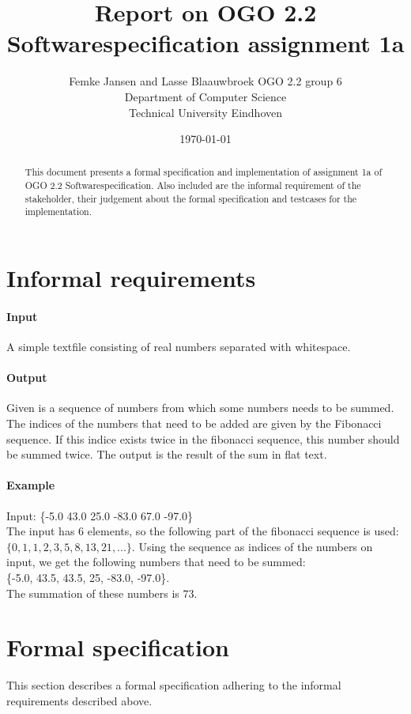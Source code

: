 \documentclass[12pt]{article}
\title{Report on OGO 2.2 Softwarespecification assignment 1a}
\author{
        Femke Jansen and Lasse Blaauwbroek OGO 2.2 group 6 \\
                Department of Computer Science\\
        Technical University Eindhoven\\
}
\date{\today}
\begin{document}
\maketitle

\begin{abstract}
This document presents a formal specification and implementation of assignment 1a of OGO 2.2 Softwarespecification. Also included are the informal requirement of the stakeholder, their judgement about the formal specification and testcases for the implementation.
\end{abstract}

\section{Informal requirements}
\paragraph{Input} A simple textfile consisting of real numbers separated with whitespace.
\paragraph{Output} Given is a sequence of numbers from which some numbers needs to be summed. The indices of the numbers that need to be added are given by the Fibonacci sequence. If this indice exists twice in the fibonacci sequence, this number should be summed twice. The output is the result of the sum in flat text.
\paragraph{Example}
Input: \{-5.0 43.0 25.0 -83.0 67.0 -97.0\}\\
The input has $6$ elements, so the following part of the fibonacci sequence is used: $\{0, 1, 1, 2, 3, 5, 8, 13, 21, ...\}$. Using the sequence as indices of the numbers on input, we get the following numbers that need to be summed: \\ \{-5.0, 43.5, 43.5, 25, -83.0, -97.0\}. \\ The summation of these numbers is $73$.

\section{Formal specification}

This section describes a formal specification adhering to the informal requirements described above.
\end{document}
